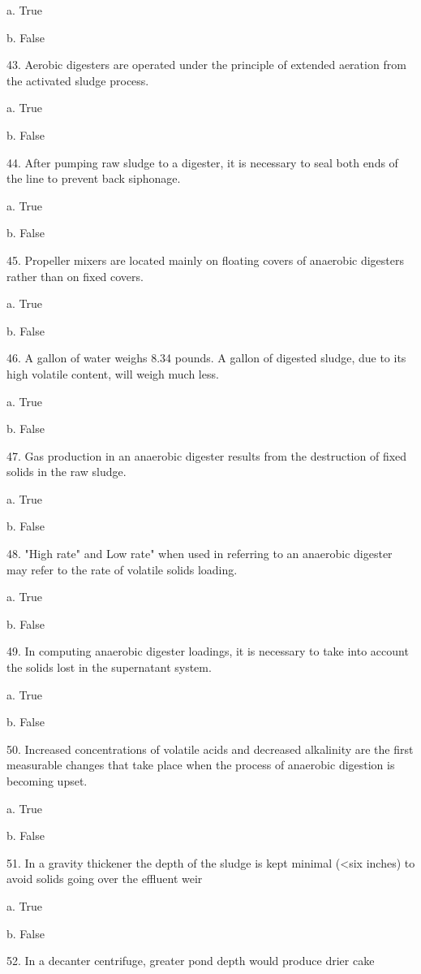 \documentclass{article}
\begin{document}
a. True 

b. False 


43. Aerobic digesters are operated under the principle of extended aeration from the activated sludge process. 

a. True 

b. False 


44. After pumping raw sludge to a digester, it is necessary to seal both ends of the line to prevent back siphonage. 

a. True 

b. False 


45. Propeller mixers are located mainly on floating covers of anaerobic digesters rather than on fixed covers. 

a. True 

b. False 


46. A gallon of water weighs 8.34 pounds. A gallon of digested sludge, due to its high volatile content, will weigh much less. 

a. True 

b. False 


47. Gas production in an anaerobic digester results from the destruction of fixed solids in the raw sludge. 

a. True 

b. False 


48. "High rate" and Low rate" when used in referring to an anaerobic digester may refer to the rate of volatile solids loading. 

a. True 

b. False 


49. In computing anaerobic digester loadings, it is necessary to take into account the solids lost in the supernatant system. 

a. True 

b. False 


50. Increased concentrations of volatile acids and decreased alkalinity are the first measurable changes that take place when the process of anaerobic digestion is becoming upset. 

a. True 

b. False 


51. In a gravity thickener the depth of the sludge is kept minimal (<six inches) to avoid solids going over the effluent weir 

a. True 

b. False 


52. In a decanter centrifuge, greater pond depth would produce drier cake 
\end{document}
